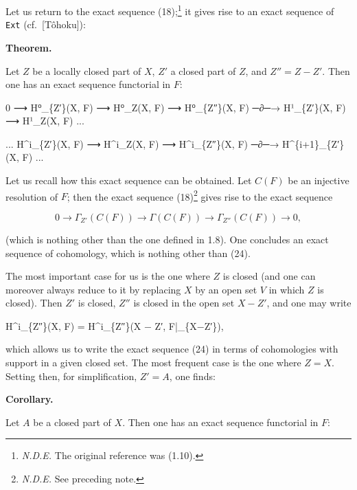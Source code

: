 \documentclass[
  11pt,
  a4paper,
]{book}
\newenvironment{Shaded}{}{}
\newcommand{\NormalTok}[1]{#1}
\begin{document}
Let us return to the exact sequence (18);\footnote{\emph{N.D.E.} The
  original reference was (1.10).} it gives rise to an exact sequence of
\texttt{Ext} (cf.~{[}Tôhoku{]}):

\textbf{Theorem.}

Let \(Z\) be a locally closed part of \(X\), \(Z'\) a closed part of
\(Z\), and \(Z'' = Z - Z'\). Then one has an exact sequence functorial
in \(F\):

\begin{Shaded}
\begin{Highlighting}[]
\NormalTok{0 ⟶ H⁰\_\{Z′\}(X, F) ⟶ H⁰\_Z(X, F) ⟶ H⁰\_\{Z″\}(X, F) ─∂─→ H¹\_\{Z′\}(X, F) ⟶ H¹\_Z(X, F) ...}

\NormalTok{... H\^{}i\_\{Z′\}(X, F) ⟶ H\^{}i\_Z(X, F) ⟶ H\^{}i\_\{Z″\}(X, F) ─∂─→ H\^{}\{i+1\}\_\{Z′\}(X, F) ...}
\end{Highlighting}
\end{Shaded}

Let us recall how this exact sequence can be obtained. Let \(C(F)\) be
an injective resolution of \(F\); then the exact sequence
(18)\footnote{\emph{N.D.E.} See preceding note.} gives rise to the exact
sequence

\[ 0 \longrightarrow \Gamma_{Z'}(C(F)) \longrightarrow \Gamma(C(F)) \longrightarrow \Gamma_{Z''}(C(F)) \longrightarrow
0, \]

(which is nothing other than the one defined in 1.8). One concludes an
exact sequence of cohomology, which is nothing other than (24).

The most important case for us is the one where \(Z\) is closed (and one
can moreover always reduce to it by replacing \(X\) by an open set \(V\)
in which \(Z\) is closed). Then \(Z'\) is closed, \(Z''\) is closed in
the open set \(X - Z'\), and one may write

\begin{Shaded}
\begin{Highlighting}[]
\NormalTok{H\^{}i\_\{Z″\}(X, F) = H\^{}i\_\{Z″\}(X − Z′, F|\_\{X−Z′\}),}
\end{Highlighting}
\end{Shaded}

which allows us to write the exact sequence (24) in terms of
cohomologies with support in a given closed set. The most frequent case
is the one where \(Z = X\). Setting then, for simplification,
\(Z' = A\), one finds:

\textbf{Corollary.}

Let \(A\) be a closed part of \(X\). Then one has an exact sequence
functorial in \(F\):
\end{document}
